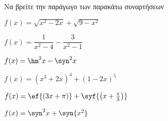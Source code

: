 Να βρείτε την παράγωγο των παρακάτω συναρτήσεων
\begin{multicols}{2}
\begin{alist}
\item $ f(x)=\sqrt{x^2-2x}+\sqrt{9-x^2} $
\item $ f(x)=\dfrac{1}{x^2-4}-\dfrac{3}{x^2-1} $
\item $ f(x)=\hm^3{x}-\syn^2{x} $
\item $ f(x)=(x^3+2x)^4+(1-2x)^5 $
\item $ f(x)=\ef{\left(3x+\pi\right)}+\syf{\left(x+\frac{\pi}{3}\right)} $
\item $ f(x)=\syn^2{x}+\syn{x^2} $
\end{alist}
\end{multicols}
